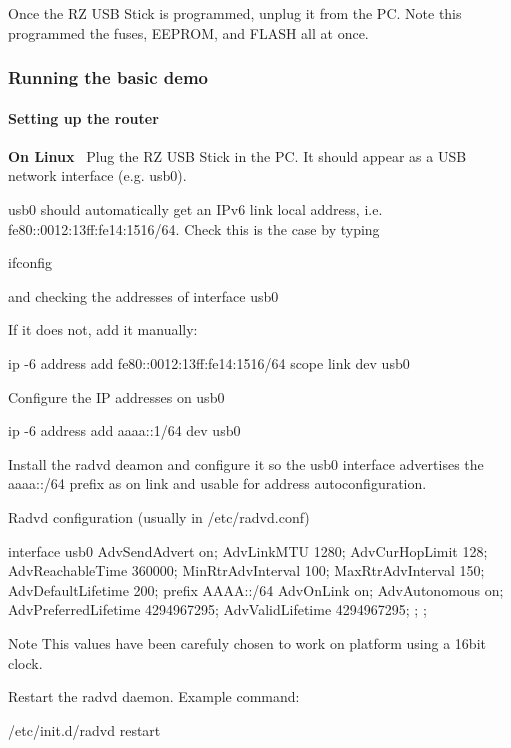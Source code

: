 Once the RZ U\+SB Stick is programmed, unplug it from the PC. Note this programmed the fuses, E\+E\+P\+R\+OM, and F\+L\+A\+SH all at once.



 \hypertarget{a00072_running}{}\subsubsection{Running the basic demo}\label{a00072_running}
\hypertarget{a00072_running_router}{}\paragraph{Setting up the router}\label{a00072_running_router}
{\bfseries On Linux}~\newline
 Plug the RZ U\+SB Stick in the PC. It should appear as a U\+SB network interface (e.\+g. usb0).

usb0 should automatically get an I\+Pv6 link local address, i.\+e. fe80\+:\+:0012\+:13ff\+:fe14\+:1516/64. Check this is the case by typing \begin{DoxyVerb}ifconfig
\end{DoxyVerb}
 and checking the addresses of interface usb0

If it does not, add it manually\+: \begin{DoxyVerb}ip -6 address add fe80::0012:13ff:fe14:1516/64 scope link dev usb0
\end{DoxyVerb}


Configure the IP addresses on usb0 \begin{DoxyVerb}ip -6 address add aaaa::1/64 dev usb0
\end{DoxyVerb}


Install the radvd deamon and configure it so the usb0 interface advertises the aaaa\+:\+:/64 prefix as on link and usable for address autoconfiguration.

Radvd configuration (usually in /etc/radvd.conf) \begin{DoxyVerb}interface usb0
{
    AdvSendAdvert on;
    AdvLinkMTU 1280;
    AdvCurHopLimit 128;
    AdvReachableTime 360000;
    MinRtrAdvInterval 100;
    MaxRtrAdvInterval 150;
    AdvDefaultLifetime 200;
    prefix AAAA::/64
    {
        AdvOnLink on;
        AdvAutonomous on;
        AdvPreferredLifetime 4294967295; 
        AdvValidLifetime 4294967295; 
    };
};
\end{DoxyVerb}
 \begin{DoxyNote}{Note}
This values have been carefuly chosen to work on platform using a 16bit clock.
\end{DoxyNote}
Restart the radvd daemon. Example command\+: \begin{DoxyVerb}/etc/init.d/radvd restart
\end{DoxyVerb}


